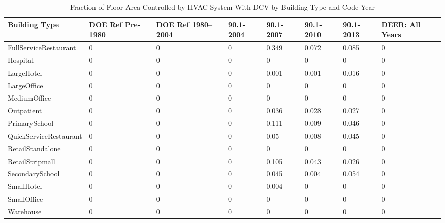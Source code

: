 \begin{table}
\centering
\small
\caption[Demand Controlled Ventilation Prevalence]{Fraction of Floor Area Controlled by HVAC System With DCV by Building Type and Code Year}
\label{tab:dcv_prev}
\begin{tabular}{|p{2.5cm}|p{0.5in}|p{0.5in}|p{0.5in}|p{0.5in}|p{0.5in}|p{0.5in}|p{0.5in}|}
\hline
\textbf{Building Type} &
  \textbf{DOE Ref Pre-1980} &
  \textbf{DOE Ref 1980--2004} &
  \textbf{90.1-2004} &
  \textbf{90.1-2007} &
  \textbf{90.1-2010} &
  \textbf{90.1-2013} &
  \textbf{DEER: All Years} \\ \hline
FullService\-Restaurant  & 0 & 0 & 0 & 0.349 & 0.072 & 0.085 & 0 \\ \hline
Hospital               & 0 & 0 & 0 & 0     & 0     & 0     & 0 \\ \hline
LargeHotel             & 0 & 0 & 0 & 0.001 & 0.001 & 0.016 & 0 \\ \hline
LargeOffice            & 0 & 0 & 0 & 0     & 0     & 0     & 0 \\ \hline
MediumOffice           & 0 & 0 & 0 & 0     & 0     & 0     & 0 \\ \hline
Outpatient             & 0 & 0 & 0 & 0.036 & 0.028 & 0.027 & 0 \\ \hline
PrimarySchool          & 0 & 0 & 0 & 0.111 & 0.009 & 0.046 & 0 \\ \hline
QuickService\-Restaurant & 0 & 0 & 0 & 0.05  & 0.008 & 0.045 & 0 \\ \hline
RetailStandalone       & 0 & 0 & 0 & 0     & 0     & 0     & 0 \\ \hline
RetailStripmall        & 0 & 0 & 0 & 0.105 & 0.043 & 0.026 & 0 \\ \hline
SecondarySchool        & 0 & 0 & 0 & 0.045 & 0.004 & 0.054 & 0 \\ \hline
SmallHotel             & 0 & 0 & 0 & 0.004 & 0     & 0     & 0 \\ \hline
SmallOffice            & 0 & 0 & 0 & 0     & 0     & 0     & 0 \\ \hline
Warehouse              & 0 & 0 & 0 & 0     & 0     & 0     & 0 \\ \hline
\end{tabular}
\end{table}